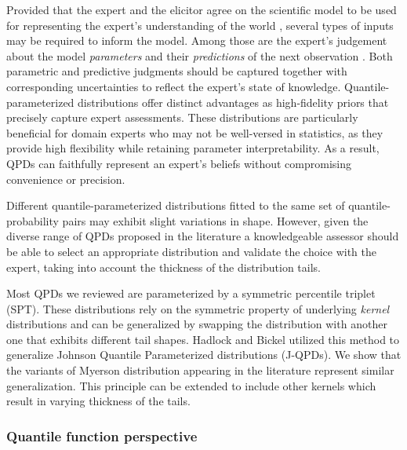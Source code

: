 \documentclass[
  fleqn,
  deca,
  blindrev
]{informs4}
\begin{document}
Provided that the expert and the elicitor agree on the scientific model
to be used for representing the expert's understanding of the world
\citep{burgman2021ElicitingModelStructures}, several types of inputs may
be required to inform the model. Among those are the expert's judgement
about the model \emph{parameters}
\citep{mikkola2021PriorKnowledgeElicitation, ohagan2019ExpertKnowledgeElicitation}
and their \emph{predictions} of the next observation
\citep{akbarov2009ProbabilityElicitationPredictive, kadane1998ExperiencesElicitation, winkler1980PriorInformationPredictive}.
Both parametric and predictive judgments should be captured together
with corresponding uncertainties to reflect the expert's state of
knowledge. Quantile-parameterized distributions offer distinct
advantages as high-fidelity priors that precisely capture expert
assessments. These distributions are particularly beneficial for domain
experts who may not be well-versed in statistics, as they provide high
flexibility while retaining parameter interpretability. As a result,
QPDs can faithfully represent an expert's beliefs without compromising
convenience or precision.

Different quantile-parameterized distributions fitted to the same set of
quantile-probability pairs may exhibit slight variations in shape.
However, given the diverse range of QPDs proposed in the literature a
knowledgeable assessor should be able to select an appropriate
distribution and validate the choice with the expert, taking into
account the thickness of the distribution tails.

Most QPDs we reviewed are parameterized by a symmetric percentile
triplet (SPT). These distributions rely on the symmetric property of
underlying \emph{kernel} distributions and can be generalized by
swapping the distribution with another one that exhibits different tail
shapes. Hadlock and Bickel
\citep{hadlock2019GeneralizedJohnsonQuantileParameterized} utilized this
method to generalize Johnson Quantile Parameterized distributions
(J-QPDs). We show that the variants of Myerson distribution appearing in
the literature
\citep{myerson2005ProbabilityModelsEconomic, wilson2023ReconciliationExpertPriors}
represent similar generalization. This principle can be extended to
include other kernels which result in varying thickness of the tails.

\subsubsection*{Quantile function
perspective}\label{quantile-function-perspective}
\end{document}
